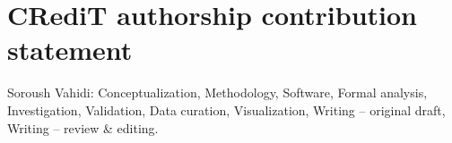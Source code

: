 \section*{CRediT authorship contribution statement}
Soroush Vahidi: Conceptualization, Methodology, Software, Formal analysis, Investigation, Validation, Data curation, Visualization, Writing -- original draft, Writing -- review \& editing.
